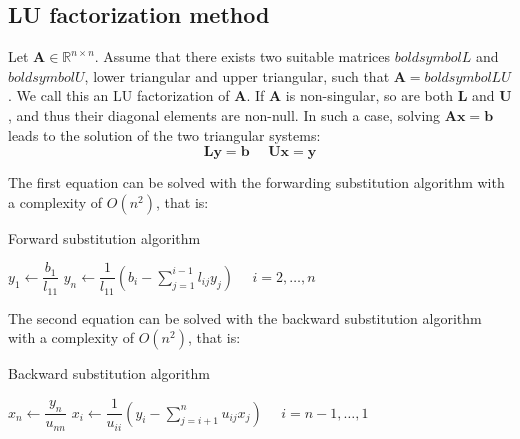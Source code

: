\documentclass[12pt, a4paper]{report}
\newtheorem[style=M,bodystyle=\normalfont]{theorem}{Theorem}
\newtheorem[style=M,bodystyle=\normalfont]{proposition}{Proposition}
\newtheorem[style=M,bodystyle=\normalfont]{corollary}{Corollary}
\newtheorem[style=M,bodystyle=\normalfont]{lemma}{Lemma}
\newtheorem[style=M,bodystyle=\normalfont]{definition}{Definition}
\begin{document}
    \subsection{LU factorization method}
    Let $\boldsymbol{A} \in \mathbb{R}^{n \times n}$. Assume that there exists two suitable matrices $boldsymbol{L}$ and $boldsymbol{U}$, 
    lower triangular and upper triangular, such that $\boldsymbol{A}=boldsymbol{LU}$. We call this an LU factorization of $\boldsymbol{A}$. 
    If $\boldsymbol{A}$ is non-singular, so are both $\boldsymbol{L}$ and $\boldsymbol{U}$, and thus their diagonal elements are non-null. 
    In such a case, solving $\boldsymbol{Ax}=\boldsymbol{b}$ leads to the solution of the two triangular systems:
    \[\boldsymbol{Ly}=\boldsymbol{b}\:\:\:\:\:\:\boldsymbol{Ux}=\boldsymbol{y}\]
    
    The first equation can be solved with the forwarding substitution algorithm with a complexity of $O(n^2)$, that is: 
    \begin{algorithm}[H]
        \caption{Forward substitution algorithm}
            \begin{algorithmic}
                \State $y_1\leftarrow\dfrac{b_1}{l_{11}}$
                \State $y_n\leftarrow\dfrac{1}{l_{11}}\left( b_i-\sum_{j=1}^{i-1}{l_{ij}y_j} \right) \:\:\:\:\:\: i=2,\dots,n$
            \end{algorithmic}
    \end{algorithm}

    The second equation can be solved with the backward substitution algorithm with a complexity of $O(n^2)$, that is: 
    \begin{algorithm}[H]
        \caption{Backward substitution algorithm}
            \begin{algorithmic}
                \State $x_n\leftarrow\dfrac{y_n}{u_{nn}}$
                \State $x_i\leftarrow\dfrac{1}{u_{ii}} \left( y_i-\sum_{j=i+1}^{n}{u_{ij}x_j} \right) \:\:\:\:\:\: i=n-1,\dots,1$
            \end{algorithmic}
    \end{algorithm}
\end{document}
